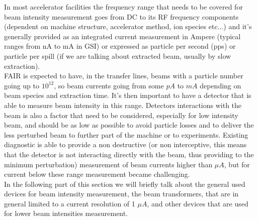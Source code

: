 \documentclass[12pt,a4paper]{report}
\begin{document}
	In most accelerator facilities the frequency range that needs to be covered for beam intensity measurement goes from DC to its RF frequency components (dependent on machine structure, accelerator method, ion species etc...) and it's generally provided as an integrated current measurement in Ampere (typical ranges from nA to mA in GSI) or expressed as particle per second (pps) or particle per spill (if we are talking about extracted beam, usually by slow extraction). \\
	FAIR is expected to have, in the transfer lines, beams with a particle number going up to $10^{12}$, so beam currents going from some $pA$ to $mA$ depending on beam species and extraction time. It's then important to have a detector that is able to measure beam intensity in this range. Detectors interactions with the beam is also a factor that need to be considered, especially for low intensity beam, and should be as low as possible to avoid particle losses and to deliver the less perturbed beam to further part of the machine or to experiments. Existing diagnostic is able to provide a non destructive (or non interceptive, this means that the detector is not interacting directly with the beam, thus providing to the minimum perturbation) measurement of beam currents higher than $\mu A$, but for current below these range measurement became challenging.  \\
	In the following part of this section we will briefly talk about the general used devices for beam intensity measurement, the beam transformers, that are in general limited to a current resolution of 1 $\mu A$, and other devices that are used for lower beam intensities measurement. 
\end{document}
